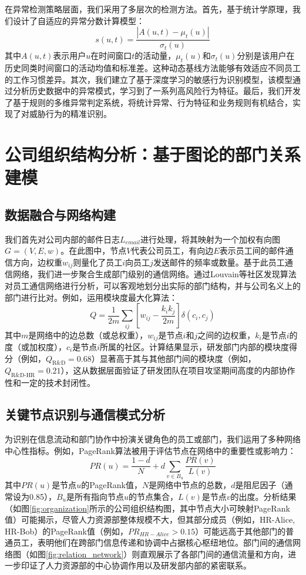 \documentclass[UTF8,12pt]{ctexart}
\begin{document}
在异常检测策略层面，我们采用了多层次的检测方法。首先，基于统计学原理，我们设计了自适应的异常分数计算模型：
\begin{equation}
s(u,t) = \frac{|A(u,t) - \mu_t(u)|}{\sigma_t(u)}
\end{equation}
其中$A(u,t)$表示用户$u$在时间窗口$t$的活动量，$\mu_t(u)$和$\sigma_t(u)$分别是该用户在历史同类时间窗口的活动均值和标准差。这种动态基线方法能够有效适应不同员工的工作习惯差异。其次，我们建立了基于深度学习的敏感行为识别模型，该模型通过分析历史数据中的异常模式，学习到了一系列高风险行为特征。最后，我们开发了基于规则的多维异常判定系统，将统计异常、行为特征和业务规则有机结合，实现了对威胁行为的精准识别。

\section{公司组织结构分析：基于图论的部门关系建模}
\subsection{数据融合与网络构建}
我们首先对公司内部的邮件日志$L_{email}$进行处理，将其映射为一个加权有向图$G=(V,E,w)$。在此图中，节点$V$代表公司员工，有向边$E$表示员工间的邮件通信方向，边权重$w_{ij}$则量化了员工$i$向员工$j$发送邮件的频率或数量。基于此员工通信网络，我们进一步聚合生成部门级别的通信网络。通过Louvain等社区发现算法对员工通信网络进行分析，可以客观地划分出实际的部门结构，并与公司名义上的部门进行比对。例如，运用模块度最大化算法：
\begin{equation}
Q = \frac{1}{2m}\sum_{ij}[w_{ij} - \frac{k_i k_j}{2m}]\delta(c_i,c_j)
\end{equation}
其中$m$是网络中的边总数（或总权重），$w_{ij}$是节点$i$和$j$之间的边权重，$k_i$是节点$i$的度（或加权度），$c_i$是节点$i$所属的社区。计算结果显示，研发部门内部的模块度得分（例如，$Q_{\text{R\&D}}=0.68$）显著高于其与其他部门间的模块度（例如，$Q_{\text{R\&D-HR}}=0.21$），这从数据层面验证了研发团队在项目攻坚期间高度的内部协作性和一定的技术封闭性。

\subsection{关键节点识别与通信模式分析}
为识别在信息流动和部门协作中扮演关键角色的员工或部门，我们运用了多种网络中心性指标。例如，PageRank算法被用于评估节点在网络中的重要性或影响力：
\begin{equation}
PR(u) = \frac{1-d}{N} + d \sum_{v\in B_u}\frac{PR(v)}{L(v)}
\end{equation}
其中$PR(u)$是节点$u$的PageRank值，$N$是网络中节点的总数，$d$是阻尼因子（通常设为0.85），$B_u$是所有指向节点$u$的节点集合，$L(v)$是节点$v$的出度。分析结果（如图\ref{fig:organization}所示的公司组织结构图，其中节点大小可映射PageRank值）可能揭示，尽管人力资源部整体规模不大，但其部分成员（例如，HR-Alice, HR-Bob）的PageRank值（例如，$PR_{HR-Alice} > 0.15$）可能远高于其他部门的普通员工，表明他们在跨部门信息传递和协调中占据核心枢纽地位。部门间的通信网络图（如图\ref{fig:relation_network}）则直观展示了各部门间的通信流量和方向，进一步印证了人力资源部的中心协调作用以及研发部内部的紧密联系。
\end{document}
